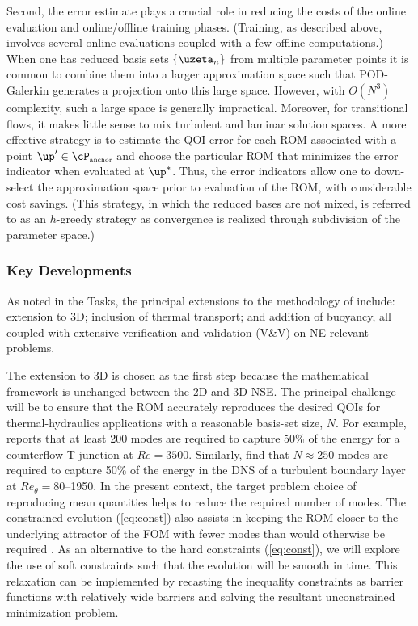 Second, the error estimate plays a crucial role in reducing the costs
of the online evaluation and online/offline training phases. (Training, as
described above, involves several online evaluations coupled with a few offline
computations.)   When one has reduced basis sets $\{\uzeta_n\}$ from multiple
parameter points it is common to combine them into a larger approximation space
such that POD-Galerkin generates a projection onto this large space.  However,
with $O(N^3)$ complexity, such a large space is generally
impractical.  Moreover, for transitional flows, it makes little sense to mix
turbulent and laminar solution spaces.   A more effective strategy is to
estimate the QOI-error for each ROM associated with a point $\up' \in
\cP_{\mbox{\tiny anchor}}$ and choose the particular ROM that minimizes
the error indicator when evaluated at $\up^*$.
Thus, the error indicators allow one to down-select the approximation
space prior to evaluation of the ROM, with considerable cost savings.
(This strategy, in which the reduced bases are not mixed, is referred to
as an $h$-greedy strategy as convergence is realized through subdivision
of the parameter space.)



\vspace*{.1in}
\subsubsection*{Key Developments}

As noted in the Tasks, the principal extensions to the methodology of
\cite{fick18} include: extension to 3D; inclusion of thermal transport;
and addition of buoyancy, all coupled with extensive verification and
validation (V\&V) on NE-relevant problems.

   The extension to 3D is chosen as the first step because the mathematical
framework is unchanged between the 2D and 3D NSE.  The principal challenge will
be to ensure that the ROM accurately reproduces the desired QOIs for
thermal-hydraulics applications with a reasonable basis-set size, $N$.
%
  For example,  \cite{merzari11b} reports that at least 200 modes are required
to capture 50\% of the energy for a counterflow T-junction at $Re=3500$.
Similarly, \cite{adrian10} find that $N\approx 250$ modes are required to
capture 50\% of the energy in the DNS of a turbulent boundary layer at
$Re_{\theta}=80$--1950.  
    In the present context, the target problem choice of reproducing mean
quantities helps to reduce the required number of modes.
    The constrained evolution (\ref{eq:const}) also assists in keeping the 
ROM closer to the underlying attractor of the FOM with fewer modes than would
otherwise be required \cite{fick18}.  
   As an alternative to the hard constraints (\ref{eq:const}), we will 
explore the use of soft constraints such that the evolution will be smooth
in time.  This relaxation can be implemented by recasting the inequality
constraints as barrier functions with relatively wide barriers and solving 
the resultant unconstrained minimization problem.

